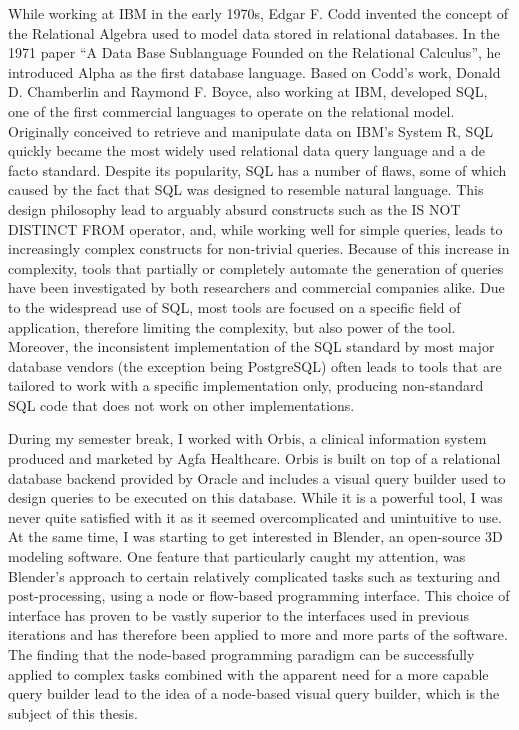 \documentclass[11pt,a4paper]{globis-book}
\begin{document}
While working at IBM in the early 1970s, Edgar F. Codd invented the concept of the Relational Algebra used to model data stored in relational databases. In the 1971 paper ``A Data Base Sublanguage Founded on the Relational Calculus''\cite{codd1971dbs}, he introduced Alpha as the first database language. Based on Codd's work, Donald D. Chamberlin and Raymond F. Boyce, also working at IBM, developed SQL, one of the first commercial languages to operate on the relational model. Originally conceived to retrieve and manipulate data on IBM's System R, SQL quickly became the most widely used relational data query language and a de facto standard. Despite its popularity, SQL has a number of flaws, some of which caused by the fact that SQL was designed to resemble natural language. This design philosophy lead to arguably absurd constructs such as the IS NOT DISTINCT FROM operator, and, while working well for simple queries, leads to increasingly complex constructs for non-trivial queries. Because of this increase in complexity, tools that partially or completely automate the generation of queries have been investigated by both researchers and commercial companies alike. Due to the widespread use of SQL, most tools are focused on a specific field of application, therefore limiting the complexity, but also power of the tool. Moreover, the inconsistent implementation of the SQL standard by most major database vendors (the exception being PostgreSQL) often leads to tools that are tailored to work with a specific implementation only, producing non-standard SQL code that does not work on other implementations.

During my semester break, I worked with Orbis, a clinical information system produced and marketed by Agfa Healthcare. Orbis is built on top of a relational database backend provided by Oracle and includes a visual query builder used to design queries to be executed on this database. While it is a powerful tool, I was never quite satisfied with it as it seemed overcomplicated and unintuitive to use. At the same time, I was starting to get interested in Blender, an open-source 3D modeling software. One feature that particularly caught my attention, was Blender's approach to certain relatively complicated tasks such as texturing and post-processing, using a node or flow-based programming interface. This choice of interface has proven to be vastly superior to the interfaces used in previous iterations and has therefore been applied to more and more parts of the software.\\
The finding that the node-based programming paradigm can be successfully applied to complex tasks combined with the apparent need for a more capable query builder lead to the idea of a node-based visual query builder, which is the subject of this thesis.
\end{document}
